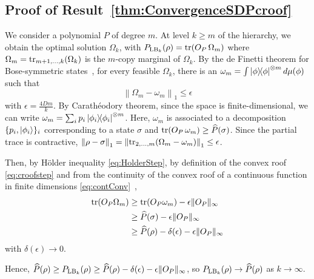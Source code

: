 \documentclass[aps,pra,twocolumn,superscriptaddress]{revtex4-2}
\begin{document}
\begin{widetext}

\appendix

\section{Proof of Result~\ref{thm:ConvergenceSDPcroof}}\label{app:ProofCongNonExtHier}
We consider a polynomial $P$ of degree $m$. At level $k \geq m$ of the hierarchy, we obtain the optimal solution $\Omega_k$, with $P_{{\rm LB}_k}(\rho) = \tr(O_P\, \Omega_m)$ where $\Omega_m = \tr_{m+1,\dots, k}(\Omega_k)$ is the $m$-copy marginal of $\Omega_k$.
By the de Finetti theorem for Bose-symmetric states~\cite[Thm.~II.8]{Christandl_2007}, for every feasible $\Omega_k$, there is an $\omega_m = \int \dyad{\phi}^{\otimes m} d\mu(\phi)$ such that
\begin{equation}
    \left\|\Omega_m - \omega_m\right\|_1 \leq \epsilon
\end{equation}
with $\epsilon = \tfrac{4 D m}{k}$. By Carath\'eodory theorem, since the space is finite-dimensional, we can write $\omega_m = \sum_i p_i \dyad{\phi_i}^{\otimes m}$. Here, $\omega_m$ is associated to a decomposition $\{p_i, \ket{\phi_i}\}_i$ corresponding to a state $\sigma$ and $\tr(O_P \,\omega_m) \geq \widehat{P}(\sigma)$. Since the partial trace is contractive, $\left\|\rho - \sigma\right\|_1 = \left\|\tr_{2,\dots, m}(\Omega_m - \omega_m)\right\|_1 \leq \epsilon$.

Then, by H\"{o}lder inequality \eqref{eq:HolderStep}, by definition of the convex roof \eqref{eq:croofstep} and from the continuity of the convex roof of a continuous function in finite dimensions \eqref{eq:contConv}~\cite[Thm.~6.1]{Bucicovschi2013},
\begin{align}
    \tr(O_P \Omega_m) &\geq \tr(O_P\omega_m) - \epsilon\|O_P\|_\infty \label{eq:HolderStep}\\
    &\geq \widehat{P}(\sigma) - \epsilon\|O_P\|_\infty \label{eq:croofstep}\\
    &\geq \widehat{P}(\rho) - \delta(\epsilon) - \epsilon\|O_P\|_\infty \label{eq:contConv}
\end{align}
with $\delta(\epsilon) \to 0$.

Hence, $\widehat{P}{(\rho)} \geq P_{{\rm LB}_k}(\rho) \geq \widehat{P}{(\rho)} -\delta(\epsilon) - \epsilon\|O_P\|_\infty$, so $P_{{\rm LB}_k}(\rho) \to \widehat{P}(\rho)$ as $k \to \infty$.


\end{widetext}
\end{document}

